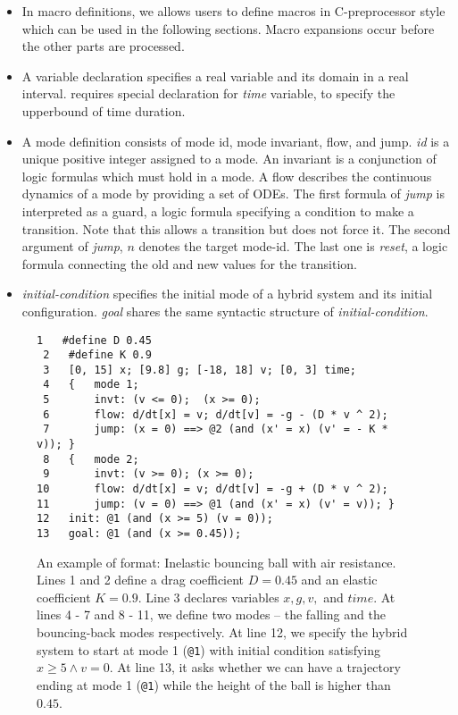 \begin{itemize}
\item In macro definitions, we allows users to define macros in
  C-preprocessor style which can be used in the following
  sections. Macro expansions occur before the other parts are
  processed.

\item A variable declaration specifies a real variable and its domain
  in a real interval. \dReach{} requires special declaration for
  \textit{time} variable, to specify the upperbound of time duration.

\item A mode definition consists of mode id, mode invariant, flow, and
  jump.  \textit{id} is a unique positive integer assigned to a
  mode. An invariant is a conjunction of logic formulas which must hold
  in a mode. A flow describes the continuous dynamics of a mode by
  providing a set of ODEs. The first formula of \textit{jump} is
  interpreted as a guard, a logic formula specifying a condition to
  make a transition. Note that this allows a transition but does not
  force it. The second argument of \textit{jump}, $n$ denotes the
  target mode-id. The last one is \textit{reset}, a logic formula
  connecting the old and new values for the transition.

\item \textit{initial-condition} specifies the initial mode of a hybrid
system and its initial configuration. \textit{goal} shares the same
syntactic structure of \textit{initial-condition}.
\end{itemize}
\vspace{-1.0em}
\begin{figure}
  \centering
  \begin{Verbatim}[fontfamily=courier, frame=single, framesep=1mm, fontsize=\scriptsize]
 1   #define D 0.45
 2   #define K 0.9
 3   [0, 15] x; [9.8] g; [-18, 18] v; [0, 3] time;
 4   {   mode 1;
 5       invt: (v <= 0);  (x >= 0);
 6       flow: d/dt[x] = v; d/dt[v] = -g - (D * v ^ 2);
 7       jump: (x = 0) ==> @2 (and (x' = x) (v' = - K * v)); }
 8   {   mode 2;
 9       invt: (v >= 0); (x >= 0);
10       flow: d/dt[x] = v; d/dt[v] = -g + (D * v ^ 2);
11       jump: (v = 0) ==> @1 (and (x' = x) (v' = v)); }
12   init: @1 (and (x >= 5) (v = 0));
13   goal: @1 (and (x >= 0.45));
\end{Verbatim}
\caption{An example of \drh{} format: Inelastic bouncing ball with air
  resistance. Lines 1 and 2 define a drag coefficient $D = 0.45$ and
  an elastic coefficient $K = 0.9$. Line 3 declares variables
  $x, g, v,$ and $time$. At lines 4 - 7 and 8 - 11, we define two
  modes -- the falling and the bouncing-back modes respectively. At
  line 12, we specify the hybrid system to start at mode 1
  (\texttt{@1}) with initial condition satisfying
  $x \ge 5 \land v = 0$. At line 13, it asks whether we can have
  a trajectory ending at mode 1 (\texttt{@1}) while the height of the
  ball is higher than $0.45$.}
\label{fig:bouncing-ball-drh}
\end{figure}
\vspace{-1.6em}
